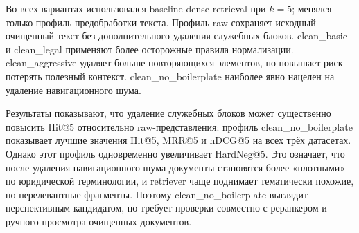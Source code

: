 \documentclass[a4paper,12pt]{article}
\begin{document}
Во всех вариантах использовался baseline dense retrieval при $k=5$; менялся только профиль предобработки текста. Профиль raw сохраняет исходный очищенный текст без дополнительного удаления служебных блоков. clean\_basic и clean\_legal применяют более осторожные правила нормализации. clean\_aggressive удаляет больше повторяющихся элементов, но повышает риск потерять полезный контекст. clean\_no\_boilerplate наиболее явно нацелен на удаление навигационного шума.

Результаты показывают, что удаление служебных блоков может существенно повысить Hit@5 относительно raw-представления: профиль clean\_no\_boilerplate показывает лучшие значения Hit@5, MRR@5 и nDCG@5 на всех трёх датасетах. Однако этот профиль одновременно увеличивает HardNeg@5. Это означает, что после удаления навигационного шума документы становятся более «плотными» по юридической терминологии, и retriever чаще поднимает тематически похожие, но нерелевантные фрагменты. Поэтому clean\_no\_boilerplate выглядит перспективным кандидатом, но требует проверки совместно с реранкером и ручного просмотра очищенных документов.
\end{document}
